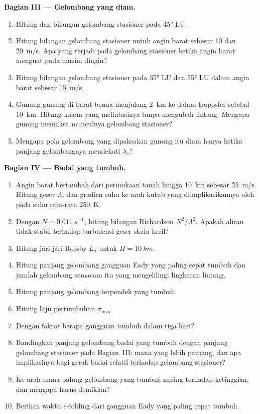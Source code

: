 \begin{problem}
\medskip\noindent\textbf{Bagian III --- Gelombang yang diam.}
\begin{enumerate}[resume]
\item Hitung  dan bilangan gelombang stasioner pada
  \ang{45} LU.
\item Hitung bilangan gelombang stasioner untuk angin barat sebesar 10 dan
  \qty{20}{m/s}. Apa yang terjadi pada gelombang stasioner ketika angin barat
  menguat pada musim dingin?
\item Hitung bilangan gelombang stasioner pada \ang{35} LU dan \ang{55} LU dalam
  angin barat sebesar \qty{15}{m/s}.
\item Gunung-gunung di barat benua menjulang \qty{2}{km} ke dalam
  troposfer setebal \qty{10}{km}. Hitung  kolom
  yang melintasinya tanpa mengubah lintang. Mengapa gunung memaksa
  munculnya gelombang stasioner?
\item Mengapa pola gelombang yang dipaksakan gunung itu diam
  hanya ketika panjang gelombangnya mendekati $\lambda_s$?
\end{enumerate}

\medskip\noindent\textbf{Bagian IV --- Badai yang tumbuh.}
\begin{enumerate}[resume]
\item Angin barat bertambah dari permukaan tanah hingga \qty{10}{km} sebesar
  \qty{25}{m/s}. Hitung geser $\Lambda$, dan gradien suhu ke arah kutub
  yang diimplikasikannya oleh  pada suhu rata-rata
  \qty{250}{K}.
\item Dengan $N = \qty{0.011}{s^{-1}}$, hitung bilangan Richardson
  $N^2/\Lambda^2$. Apakah aliran tidak stabil terhadap turbulensi geser skala kecil?
\item Hitung jari-jari Rossby $L_d$ untuk $H = \qty{10}{km}$.
\item Hitung panjang gelombang gangguan Eady yang paling cepat tumbuh dan
  jumlah gelombang semacam itu yang mengelilingi lingkaran lintang.
\item Hitung panjang gelombang terpendek yang tumbuh.
\item Hitung laju pertumbuhan $\sigma_{\max}$.
\item Dengan faktor berapa gangguan tumbuh dalam tiga hari?
\item Bandingkan panjang gelombang badai yang tumbuh dengan panjang
  gelombang stasioner pada Bagian~III: mana yang lebih panjang, dan apa implikasinya bagi
  gerak badai relatif terhadap gelombang stasioner?
\item Ke arah mana palung gelombang yang tumbuh miring terhadap ketinggian, dan
  mengapa harus demikian?
\item Berikan waktu $e$-folding dari gangguan Eady yang paling cepat tumbuh.
\end{enumerate}
\end{problem}
